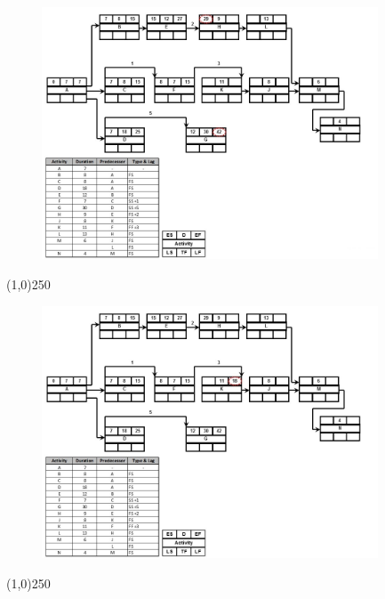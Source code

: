 \begin{frame}
\begin{figure}
	\centering
		\includegraphics[width = 10.0cm]{oldnotes/Slide208.jpg}
\end{figure}
\end{frame}
\begin{center}\line(1,0){250}\end{center}




\begin{frame}
\begin{figure}
	\centering
		\includegraphics[width = 10.0cm]{oldnotes/Slide209.jpg}
\end{figure}
\end{frame}
\begin{center}\line(1,0){250}\end{center}




